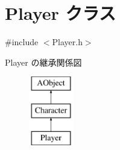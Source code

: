 \hypertarget{class_player}{\section{Player クラス}
\label{class_player}
}


{\ttfamily \#include $<$Player.\+h$>$}

Player の継承関係図\begin{figure}[H]
\begin{center}
\leavevmode
\includegraphics[height=3.000000cm]{class_player}
\end{center}
\end{figure}
